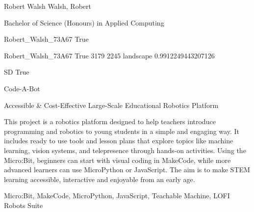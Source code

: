 
\begingroup{}\relax



\def\Key{Robert_Walsh_73A67}

{Robert Walsh}
{Walsh, Robert}

{Bachelor of Science (Honours) in Applied Computing}

{Robert_Walsh_73A67}
{True}

{Robert_Walsh_73A67}
{True}
{3179}
{2245}
{landscape}
{0.9912249443207126}

{SD}
{True}

{Code-A-Bot}

{Accessible \& Cost-Effective Large-Scale Educational Robotics Platform}

{This project is a robotics platform designed to help teachers introduce programming and robotics to young students in a simple and engaging way. It includes ready to use tools and lesson plans that explore topics like machine learning, vision systems, and telepresence through hands-on activities. Using the Micro:Bit, beginners can start with visual coding in MakeCode, while more advanced learners can use MicroPython or JavaScript. The aim is to make STEM learning accessible, interactive and enjoyable from an early age.}

{Micro:Bit, MakeCode, MicroPython, JavaScript, Teachable Machine, LOFI Robots Suite}

